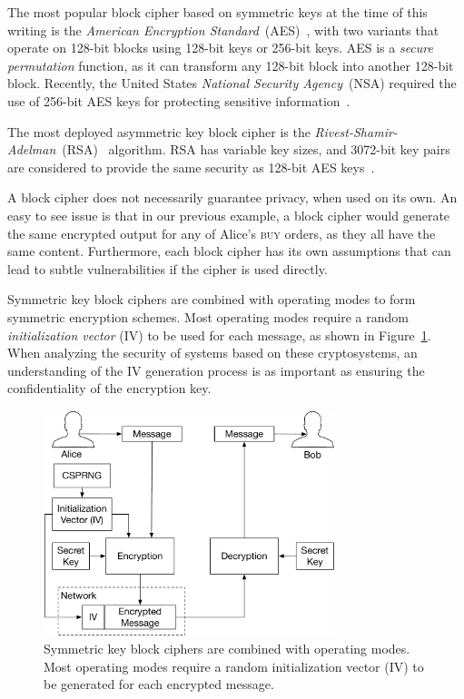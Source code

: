 The most popular block cipher based on symmetric keys at the time of this
writing is the
\textit{American Encryption Standard}~(AES)~\cite{daemen1999aes, fips2001aes},
with two variants that operate on 128-bit blocks using 128-bit keys or 256-bit
keys. AES is a \textit{secure permutation} function, as it can transform any
128-bit block into another 128-bit block. Recently, the United States
\textit{National Security Agency}~(NSA) required the use of 256-bit AES keys
for protecting sensitive information~\cite{nsa2015suiteb}.

The most deployed asymmetric key block cipher is the
\textit{Rivest-Shamir-Adelman}~(RSA)~\cite{rivest1978rsa} algorithm. RSA has
variable key sizes, and 3072-bit key pairs are considered to provide the same
security as 128-bit AES keys~\cite{fips2012keysize}.

A block cipher does not necessarily guarantee privacy, when used  on its own.
An easy to see issue is that in our previous example, a block cipher would
generate the same encrypted output for any of Alice's \textsc{buy} orders, as
they all have the same content. Furthermore, each block cipher has its own
assumptions that can lead to subtle vulnerabilities if the cipher is used
directly.

Symmetric key block ciphers are combined with operating modes to form symmetric
encryption schemes. Most operating modes require a random
\textit{initialization vector} (IV) to be used for each message, as shown in
Figure~\ref{fig:symmetric_encryption}. When analyzing the security of systems
based on these cryptosystems, an understanding of the IV generation process is
as important as ensuring the confidentiality of the encryption key.

\begin{figure}[hbt]
  \centering
  \includegraphics[width=85mm]{figures/symmetric_encryption.pdf}
  \caption{
    Symmetric key block ciphers are combined with operating modes. Most
    operating modes require a random initialization vector (IV) to be generated
    for each encrypted message.
  }
  \label{fig:symmetric_encryption}
\end{figure}

